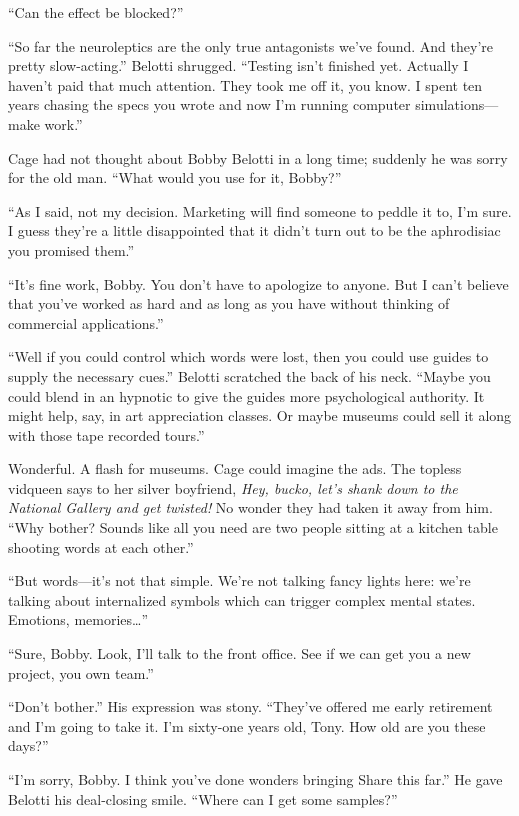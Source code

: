 ``Can the effect be blocked?''

``So far the neuroleptics are the only true antagonists we've found. And they're pretty slow-acting.'' Belotti shrugged. ``Testing isn't finished yet. Actually I haven't paid that much attention. They took me off it, you know. I spent ten years chasing the specs you wrote and now I'm running computer simulations---make work.''

Cage had not thought about Bobby Belotti in a long time; suddenly he was sorry for the old man. ``What would you use for it, Bobby?''

``As I said, not my decision. Marketing will find someone to peddle it to, I'm sure. I guess they're a little disappointed that it didn't turn out to be the aphrodisiac you promised them.''

``It's fine work, Bobby. You don't have to apologize to anyone. But I can't believe that you've worked as hard and as long as you have without thinking of commercial applications.''

``Well if you could control which words were lost, then you could use guides to supply the necessary cues.'' Belotti scratched the back of his neck. ``Maybe you could blend in an hypnotic to give the guides more psychological authority. It might help, say, in art appreciation classes. Or maybe museums could sell it along with those tape recorded tours.''

Wonderful. A flash for museums. Cage could imagine the ads. The topless vidqueen says to her silver boyfriend, \textit{Hey, bucko, let's shank down to the National Gallery and get twisted!} No wonder they had taken it away from him. ``Why bother? Sounds like all you need are two people sitting at a kitchen table shooting words at each other.''

``But words---it's not that simple. We're not talking fancy lights here: we're talking about internalized symbols which can trigger complex mental states. Emotions, memories\ldots''

``Sure, Bobby. Look, I'll talk to the front office. See if we can get you a new project, you own team.''

``Don't bother.'' His expression was stony. ``They've offered me early retirement and I'm going to take it. I'm sixty-one years old, Tony. How old are you these days?''

``I'm sorry, Bobby. I think you've done wonders bringing Share this far.'' He gave Belotti his deal-closing smile. ``Where can I get some samples?''

